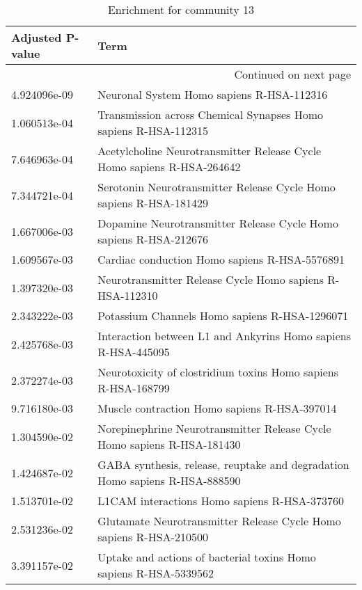 \begin{longtable}{p{2.4cm}p{14.5cm}}
\caption{Enrichment for community 13}\\
\toprule
Adjusted \newline P-value &                                                                         Term \\
\midrule
\endhead
\midrule
\multicolumn{2}{r}{{Continued on next page}} \\
\midrule
\endfoot

\bottomrule
\endlastfoot
             4.924096e-09 &                                    Neuronal System Homo sapiens R-HSA-112316 \\
             1.060513e-04 &              Transmission across Chemical Synapses Homo sapiens R-HSA-112315 \\
             7.646963e-04 &       Acetylcholine Neurotransmitter Release Cycle Homo sapiens R-HSA-264642 \\
             7.344721e-04 &           Serotonin Neurotransmitter Release Cycle Homo sapiens R-HSA-181429 \\
             1.667006e-03 &            Dopamine Neurotransmitter Release Cycle Homo sapiens R-HSA-212676 \\
             1.609567e-03 &                                Cardiac conduction Homo sapiens R-HSA-5576891 \\
             1.397320e-03 &                     Neurotransmitter Release Cycle Homo sapiens R-HSA-112310 \\
             2.343222e-03 &                                Potassium Channels Homo sapiens R-HSA-1296071 \\
             2.425768e-03 &                Interaction between L1 and Ankyrins Homo sapiens R-HSA-445095 \\
             2.372274e-03 &                Neurotoxicity of clostridium toxins Homo sapiens R-HSA-168799 \\
             9.716180e-03 &                                 Muscle contraction Homo sapiens R-HSA-397014 \\
             1.304590e-02 &      Norepinephrine Neurotransmitter Release Cycle Homo sapiens R-HSA-181430 \\
             1.424687e-02 &  GABA synthesis, release, reuptake and degradation Homo sapiens R-HSA-888590 \\
             1.513701e-02 &                                 L1CAM interactions Homo sapiens R-HSA-373760 \\
             2.531236e-02 &           Glutamate Neurotransmitter Release Cycle Homo sapiens R-HSA-210500 \\
             3.391157e-02 &            Uptake and actions of bacterial toxins Homo sapiens R-HSA-5339562 \\
\end{longtable}


